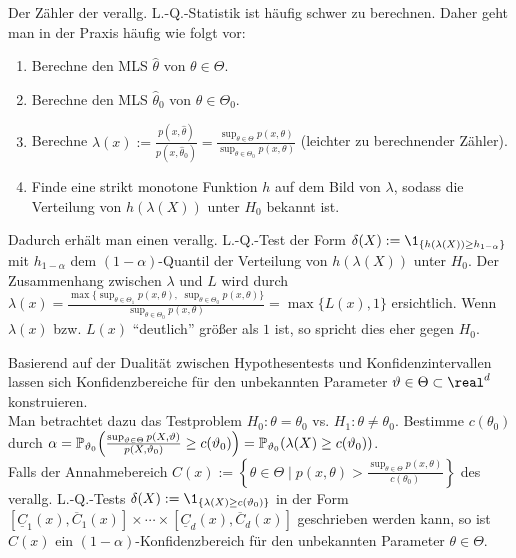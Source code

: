 \begin{Bem}
    Der Zähler der verallg. L.-Q.-Statistik ist häufig schwer zu berechnen.
    Daher geht man in der Praxis häufig wie folgt vor:
    \begin{enumerate}[label=\arabic*.]
        \item
        Berechne den MLS $\widehat{\theta}$ von $\theta \in \Theta$.

        \item
        Berechne den MLS $\widehat{\theta}_0$ von $\theta \in \Theta_0$.

        \item
        Berechne $\lambda(x) := \frac{p(x, \widehat{\theta})}{p(x, \widehat{\theta}_0)}
        = \frac{\sup_{\theta \in \Theta} p(x, \theta)}{\sup_{\theta \in \Theta_0} p(x, \theta)}$
        (leichter zu berechnender Zähler).

        \item
        Finde eine strikt monotone Funktion $h$ auf dem Bild von $\lambda$,
        sodass die Verteilung von $h(\lambda(X))$ unter $H_0$ bekannt ist.
    \end{enumerate}
    Dadurch erhält man einen verallg. L.-Q.-Test der Form
    $\delta(X) := \1_{\{h(\lambda(X)) \ge h_{1-\alpha}\}}$
    mit $h_{1-\alpha}$ dem $(1-\alpha)$-Quantil der Verteilung von $h(\lambda(X))$ unter $H_0$.
    Der Zusammenhang zwischen $\lambda$ und $L$ wird durch
    $\lambda(x) = \frac{\max\{\sup_{\theta \in \Theta_1} p(x, \theta),\;
    \sup_{\theta \in \Theta_0} p(x, \theta)\}}{\sup_{\theta \in \Theta_0} p(x, \theta)}
    = \max\{L(x), 1\}$ ersichtlich.
    Wenn $\lambda(x)$ bzw. $L(x)$ "`deutlich"' größer als $1$ ist, so spricht dies eher
    gegen $H_0$.
\end{Bem}

\linie
\pagebreak

\begin{Bem}
    Basierend auf der Dualität zwischen Hypothesentests und Konfidenzintervallen lassen sich
    Konfidenzbereiche für den unbekannten Parameter $\theta \in \Theta \subset \real^d$
    konstruieren.\\
    Man betrachtet dazu das Testproblem $H_0\colon \theta = \theta_0$ vs.
    $H_1\colon \theta \not= \theta_0$.
    Bestimme $c(\theta_0)$ durch $\alpha =
    \mathbb{P}_{\vartheta_0}\!\left(\frac{\sup_{\vartheta \in \Theta}
    p(X, \vartheta)}{p(X, \vartheta_0)} \ge c(\vartheta_0)\right)
    = \mathbb{P}_{\vartheta_0}(\lambda(X) \ge c(\vartheta_0))$.\\
    Falls der Annahmebereich
    $C(x) := \left\{\theta \in \Theta \;|\;
    p(x, \theta) > \frac{\sup_{\theta \in \Theta} p(x, \theta)}{c(\theta_0)}\right\}$
    des verallg. L.-Q.-Tests $\delta(X) := \1_{\{\lambda(X) \ge c(\theta_0)\}}$
    in der Form
    $[\underline{C}_1(x), \overline{C}_1(x)] \times \dotsb \times
    [\underline{C}_d(x), \overline{C}_d(x)]$ geschrieben werden kann,
    so ist $C(x)$ ein $(1-\alpha)$-Konfidenzbereich für den unbekannten Parameter
    $\theta \in \Theta$.
\end{Bem}

